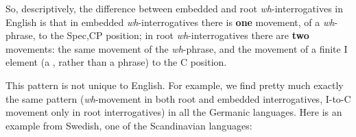\documentclass{article}
\begin{document}
\begin{exe}
\end{exe}
\vspace{-5em}
So, descriptively,  the difference between embedded and root \emph{wh}-interrogatives in English is that in embedded \emph{wh}-interrogatives there is \textbf{one} movement, of a \emph{wh}-phrase, to the Spec,CP position;  in root \emph{wh}-interrogatives there are \textbf{two} movements: the same movement of the \emph{wh}-phrase, and  the movement of a finite I element (a , rather than a phrase) to the C position. 

This pattern is not unique to English.
For example, we find pretty much exactly the same pattern (\emph{wh}-movement in both root and embedded interrogatives, I-to-C movement only in root interrogatives) in all the Germanic languages. Here is an example from Swedish, one of the Scandinavian languages:
\begin{exe}
\end{exe}
     
\end{document}
